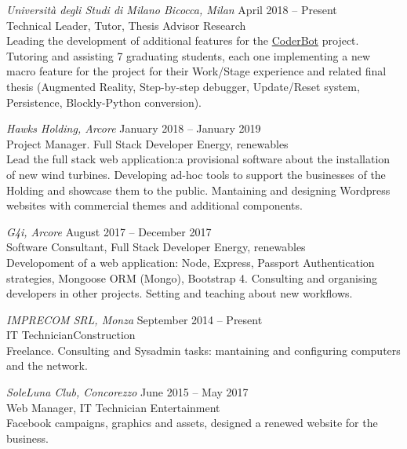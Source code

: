 \documentclass[11pt]{res} %
\begin{document}
\begin{resume}
\pagebreak
{\sl Università degli Studi di Milano Bicocca, Milan} \hfill April 2018 -- Present \\
{\sbb Technical Leader, Tutor, Thesis Advisor}  \hfill Research \\
Leading the development of additional features for the \href{ttp://www.coderbot.org/}{CoderBot} project. Tutoring and assisting 7 graduating students, each one implementing a new macro feature for the project for their Work/Stage experience and related final thesis (Augmented Reality, Step-by-step debugger, Update/Reset system, Persistence, Blockly-Python conversion).

{\sl Hawks Holding, Arcore} \hfill 
January 2018 -- January 2019 \\
{\sbb Project Manager. Full Stack Developer} \hfill Energy, renewables \\
Lead the full stack web application:a provisional software about the installation of new wind turbines.
Developing ad-hoc tools to support the businesses of the Holding and showcase them to the public. Mantaining and designing Wordpress websites with commercial themes and additional components.

{\sl G4i, Arcore} \hfill 
August 2017 -- December 2017\\
{\sbb Software Consultant, Full Stack Developer}   \hfill Energy, renewables  \\
Developoment of a web application: Node, Express, Passport Authentication strategies, Mongoose ORM (Mongo), Bootstrap 4. Consulting and organising developers in other projects. Setting and teaching about new workflows.

{\sl IMPRECOM SRL, Monza} \hfill 
September 2014 -- Present \\
{\sbb IT Technician}\hfill Construction \\
Freelance. Consulting and Sysadmin tasks: mantaining and configuring computers and the network.

{\sl SoleLuna Club, Concorezzo} \hfill 
June 2015 -- May 2017 \\
{\sbb Web Manager, IT Technician }\hfill Entertainment\\
Facebook campaigns, graphics and assets, designed a renewed website for the business.


\vspace{0.2in} %


\end{resume}
\end{document}
